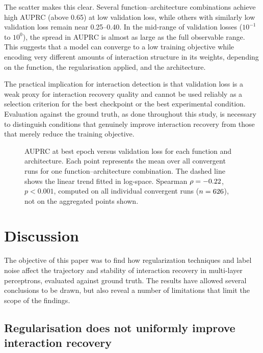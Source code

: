 \documentclass{article}
\begin{document}
The scatter makes this clear. Several function--architecture combinations achieve
high AUPRC (above 0.65) at low validation loss, while others with similarly low
validation loss remain near 0.25--0.40. In the mid-range of validation losses
($10^{-1}$ to $10^{0}$), the spread in AUPRC is almost as large as the full
observable range. This suggests that a model can converge to a low training
objective while encoding very different amounts of interaction structure in its
weights, depending on the function, the regularisation applied, and the
architecture.

The practical implication for interaction detection is that validation loss is a
weak proxy for interaction recovery quality and cannot be used reliably as a
selection criterion for the best checkpoint or the best experimental condition.
Evaluation against the ground truth, as done throughout this study, is necessary
to distinguish conditions that genuinely improve interaction recovery from those
that merely reduce the training objective.

\begin{figure}[htbp]
    \centering
    
    \caption{AUPRC at best epoch versus validation loss for each
    function and architecture. Each point represents the mean over all convergent
    runs for one function--architecture combination. The dashed line shows the
    linear trend fitted in log-space. Spearman \(\rho = -0.22\),
    \(p < 0.001\), computed on all individual convergent runs
    (\(n = 626\)), not on the aggregated points shown.}
    \label{fig:auprc_vs_val_loss}
\end{figure}

\FloatBarrier
\section{Discussion}
\label{sec:discussion}

The objective of this paper was to find how regularization techniques and label noise affect the trajectory and stability of interaction recovery in multi-layer perceptrons, evaluated against ground truth. The results have allowed several conclusions to be drawn, but also reveal a number of limitations that limit the scope of the findings.

\subsection*{Regularisation does not uniformly improve interaction recovery}
\end{document}
